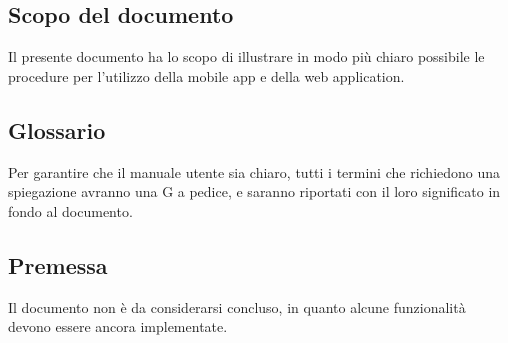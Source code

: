 \documentclass[../manuale-utente.tex]{subfiles}
\begin{document}
\subsection{Scopo del documento}%
\label{sub:scopo_del_documento}
Il presente documento ha lo scopo di illustrare in modo più chiaro possibile le procedure per l'utilizzo della mobile app e della web application.

\subsection{Glossario}%
\label{sub:glossario}
Per garantire che il manuale utente sia chiaro, tutti i termini che richiedono una spiegazione avranno una G a pedice, e saranno riportati con il loro significato in fondo al documento.

\subsection{Premessa}%
\label{sub:premessa}
Il documento non è da considerarsi concluso, in quanto alcune funzionalità devono essere ancora implementate.
\end{document}
